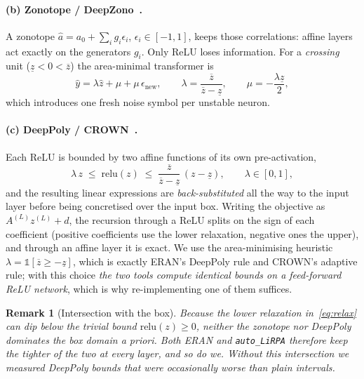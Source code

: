 \documentclass[11pt,a4paper]{article}
\newcommand{\lb}[1]{\underline{#1}}
\newcommand{\ub}[1]{\overline{#1}}
\newtheorem{remark}{Remark}
\begin{document}
\paragraph{(b) Zonotope / DeepZono~\cite{singh2018}.}
A zonotope $\hat a = a_0 + \sum_i g_i\epsilon_i$, $\epsilon_i\in[-1,1]$, keeps
those correlations: affine layers act exactly on the generators $g_i$. Only ReLU
loses information. For a \emph{crossing} unit ($\lb{z}<0<\ub{z}$) the
area-minimal transformer is
\begin{equation}
\hat y = \lambda \hat z + \mu + \mu\,\epsilon_{\text{new}},\qquad
\lambda=\frac{\ub{z}}{\ub{z}-\lb{z}},\qquad \mu = -\frac{\lambda\lb{z}}{2},
\end{equation}
which introduces one fresh noise symbol per unstable neuron.

\paragraph{(c) DeepPoly / CROWN~\cite{singh2019,zhang2018}.}
Each ReLU is bounded by two affine functions of its own pre-activation,
\begin{equation}
\lambda\, z \;\le\; \mathrm{relu}(z) \;\le\; \frac{\ub{z}}{\ub{z}-\lb{z}}\,(z-\lb{z}),
\qquad \lambda\in[0,1],
\label{eq:relax}
\end{equation}
and the resulting linear expressions are \emph{back-substituted} all the way to
the input layer before being concretised over the input box. Writing the
objective as $A^{(L)}z^{(L)}+d$, the recursion through a ReLU splits on the sign
of each coefficient (positive coefficients use the lower relaxation, negative
ones the upper), and through an affine layer it is exact. We use the
area-minimising heuristic $\lambda=\mathbb{1}[\ub{z}\ge-\lb{z}]$, which is
exactly ERAN's DeepPoly rule and CROWN's adaptive rule; with this choice
\emph{the two tools compute identical bounds on a feed-forward ReLU network},
which is why re-implementing one of them suffices.

\begin{remark}[Intersection with the box]
Because the lower relaxation in~\eqref{eq:relax} can dip below the trivial bound
$\mathrm{relu}(z)\ge0$, neither the zonotope nor DeepPoly \emph{dominates} the box
domain a priori. Both ERAN and \texttt{auto\_LiRPA} therefore keep the tighter of
the two at every layer, and so do we. Without this intersection we measured
DeepPoly bounds that were occasionally \emph{worse} than plain intervals.
\end{remark}
\end{document}
